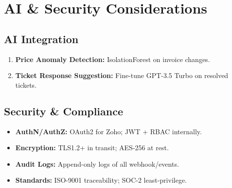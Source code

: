 \section{AI \& Security Considerations}

\subsection{AI Integration}
\begin{enumerate}
  \item \textbf{Price Anomaly Detection:} IsolationForest on invoice changes.
  \item \textbf{Ticket Response Suggestion:} Fine-tune GPT-3.5 Turbo on resolved tickets.
\end{enumerate}

\subsection{Security \& Compliance}
\begin{itemize}
  \item \textbf{AuthN/AuthZ:} OAuth2 for Zoho; JWT + RBAC internally.
  \item \textbf{Encryption:} TLS1.2+ in transit; AES-256 at rest.
  \item \textbf{Audit Logs:} Append-only logs of all webhook/events.
  \item \textbf{Standards:} ISO-9001 traceability; SOC-2 least-privilege.
\end{itemize} 